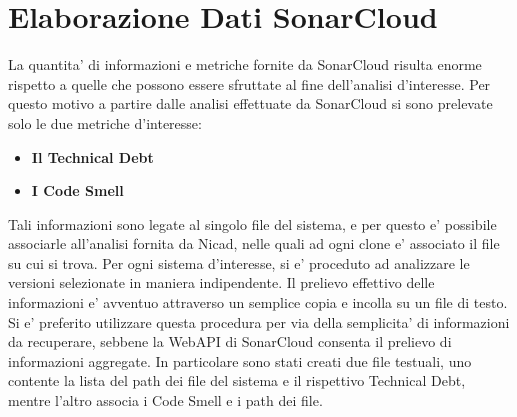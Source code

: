 \section{Elaborazione Dati SonarCloud}
La quantita' di informazioni e metriche fornite da SonarCloud risulta enorme rispetto a quelle che possono essere sfruttate al fine dell'analisi d'interesse. Per questo motivo a partire dalle analisi effettuate da SonarCloud si sono prelevate solo le due metriche d'interesse:
\begin{itemize}
	\item \textbf{Il Technical Debt} 
	\item \textbf{I Code Smell}
\end{itemize}
Tali informazioni sono legate al singolo file del sistema, e per questo e' possibile associarle all'analisi fornita da Nicad, nelle quali ad ogni clone e' associato il file su cui si trova. Per ogni sistema d'interesse, si e' proceduto ad analizzare le versioni selezionate in maniera indipendente. Il prelievo effettivo delle informazioni e' avventuo attraverso un semplice copia e incolla su un file di testo. Si e' preferito utilizzare questa procedura per via della semplicita' di informazioni da recuperare, sebbene la WebAPI di SonarCloud consenta il prelievo di informazioni aggregate.
In particolare sono stati creati due file testuali, uno contente la lista del path dei file del sistema  e il rispettivo Technical Debt, mentre l'altro associa i Code Smell e i path dei file.